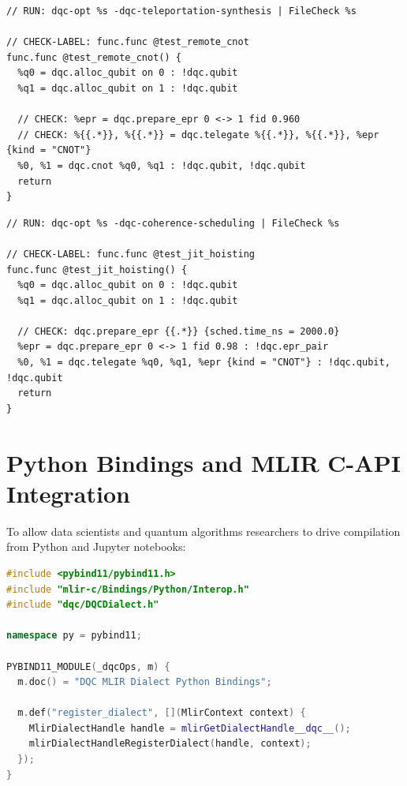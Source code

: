 \begin{lstlisting}[language=MLIR, caption={Sample FileCheck Test for Pass 3 (test/DQC/teleportation.mlir)}]
// RUN: dqc-opt %s -dqc-teleportation-synthesis | FileCheck %s

// CHECK-LABEL: func.func @test_remote_cnot
func.func @test_remote_cnot() {
  %q0 = dqc.alloc_qubit on 0 : !dqc.qubit
  %q1 = dqc.alloc_qubit on 1 : !dqc.qubit

  // CHECK: %epr = dqc.prepare_epr 0 <-> 1 fid 0.960
  // CHECK: %{{.*}}, %{{.*}} = dqc.telegate %{{.*}}, %{{.*}}, %epr {kind = "CNOT"}
  %0, %1 = dqc.cnot %q0, %q1 : !dqc.qubit, !dqc.qubit
  return
}
\end{lstlisting}

\begin{lstlisting}[language=MLIR, caption={Sample FileCheck Test for Pass 4 JIT Scheduling (test/DQC/scheduling.mlir)}]
// RUN: dqc-opt %s -dqc-coherence-scheduling | FileCheck %s

// CHECK-LABEL: func.func @test_jit_hoisting
func.func @test_jit_hoisting() {
  %q0 = dqc.alloc_qubit on 0 : !dqc.qubit
  %q1 = dqc.alloc_qubit on 1 : !dqc.qubit

  // CHECK: dqc.prepare_epr {{.*}} {sched.time_ns = 2000.0}
  %epr = dqc.prepare_epr 0 <-> 1 fid 0.98 : !dqc.epr_pair
  %0, %1 = dqc.telegate %q0, %q1, %epr {kind = "CNOT"} : !dqc.qubit, !dqc.qubit
  return
}
\end{lstlisting}

\section{Python Bindings and MLIR C-API Integration}
\label{sec:app_python_bindings}

To allow data scientists and quantum algorithms researchers to drive compilation from Python and Jupyter notebooks:

\begin{lstlisting}[language=C++, caption={pybind11 MLIR Python Bindings (python/dqc/DQCModule.cpp)}]
#include <pybind11/pybind11.h>
#include "mlir-c/Bindings/Python/Interop.h"
#include "dqc/DQCDialect.h"

namespace py = pybind11;

PYBIND11_MODULE(_dqcOps, m) {
  m.doc() = "DQC MLIR Dialect Python Bindings";

  m.def("register_dialect", [](MlirContext context) {
    MlirDialectHandle handle = mlirGetDialectHandle__dqc__();
    mlirDialectHandleRegisterDialect(handle, context);
  });
}
\end{lstlisting}

